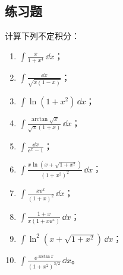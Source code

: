 \subsection{练习题}

\begin{xexercise}[1]
计算下列不定积分：
  \begin{enumerate}[label=(\arabic*)]
    \item $\displaystyle\int\frac{x}{1+x^4}\,\dd x$；
    \item $\displaystyle\int\frac{\dd x}{\sqrt{x(1-x)}}$；
    \item $\displaystyle\int\ln(1+x^2)\,\dd x$；
    \item $\displaystyle\int\frac{\arctan\sqrt{x}}{\sqrt{x}(1+x)}\,\dd x$；
    \item $\displaystyle\int\frac{\dd x}{\ee^x-1}$；
    \item $\displaystyle\int\frac{x\ln(x+\sqrt{1+x^2})}{(1+x^2)^2}\,\dd x$；
    \item $\displaystyle\int\frac{x\ee^x}{(1+x)^2}\,\dd x$；
    \item $\displaystyle\int\frac{1+x}{x(1+x\ee^x)}\,\dd x$；
    \item $\displaystyle\int\ln^2(x+\sqrt{1+x^2})\,\dd x$；
    \item $\displaystyle\int\frac{\ee^{\arctan x}}{(1+x^2)^{3/2}}\,\dd x$。
  \end{enumerate}
\end{xexercise}
